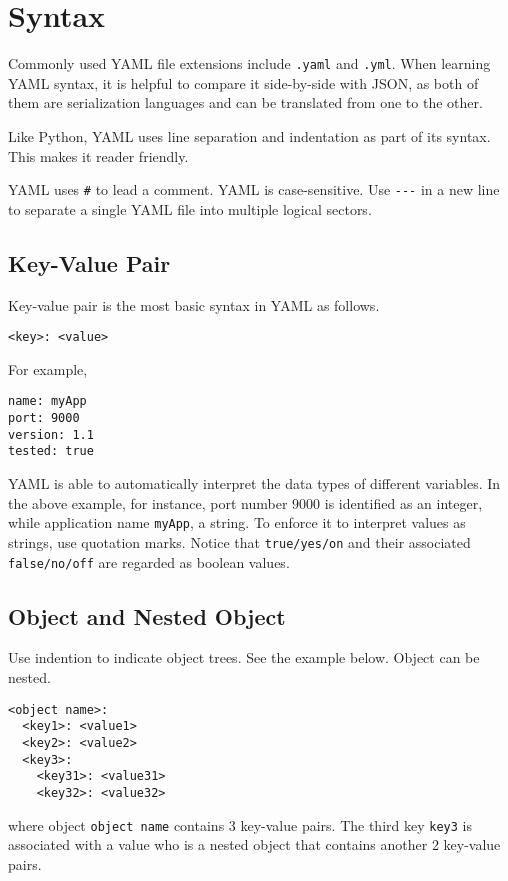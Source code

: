 \section{Syntax}

Commonly used YAML file extensions include \verb|.yaml| and \verb|.yml|. When learning YAML syntax, it is helpful to compare it side-by-side with JSON, as both of them are serialization languages and can be translated from one to the other.

Like Python, YAML uses line separation and indentation as part of its syntax. This makes it reader friendly.

YAML uses \verb|#| to lead a comment. YAML is case-sensitive. Use \verb|---| in a new line to separate a single YAML file into multiple logical sectors.

\subsection{Key-Value Pair}

Key-value pair is the most basic syntax in YAML as follows.
\begin{lstlisting}
<key>: <value>
\end{lstlisting}
For example,
\begin{lstlisting}
name: myApp
port: 9000
version: 1.1
tested: true
\end{lstlisting}

YAML is able to automatically interpret the data types of different variables. In the above example, for instance, port number $9000$ is identified as an integer, while application name \verb|myApp|, a string. To enforce it to interpret values as strings, use quotation marks. Notice that \verb|true/yes/on| and their associated \verb|false/no/off| are regarded as boolean values.


\subsection{Object and Nested Object}

Use indention to indicate object trees. See the example below. Object can be nested.
\begin{lstlisting}
<object name>:
  <key1>: <value1>
  <key2>: <value2>
  <key3>:
    <key31>: <value31>
    <key32>: <value32>
\end{lstlisting}
where object \verb|object name| contains 3 key-value pairs. The third key \verb|key3| is associated with a value who is a nested object that contains another 2 key-value pairs.


